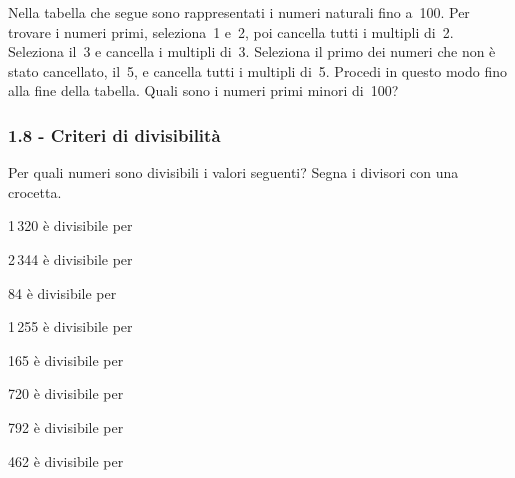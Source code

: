 \begin{esercizio}
\label{ese:1.16}
\begin{multicols}{2}
Nella tabella che segue sono rappresentati i numeri naturali fino a~100. Per trovare i
numeri primi, seleziona~1 e~2, poi cancella tutti i multipli di~2. Seleziona il~3 e cancella i multipli di~3. Seleziona il
primo dei numeri che non è stato cancellato, il~5, e cancella
tutti i multipli di~5. Procedi in questo modo fino alla fine
della tabella. Quali sono i numeri primi minori di~100?

\columnbreak\vfil

\end{multicols}
\end{esercizio}

\subsubsection*{1.8 - Criteri di divisibilità}
\begin{esercizio}
\label{ese:1.17}
 Per quali numeri sono divisibili i valori seguenti? Segna i divisori con una crocetta.
\TabPositions{3.5cm}
 \begin{enumeratea}
 \item 1\,320 è divisibile per \tab{}\:\:\:\:\:\:\:\:\:
 \item 2\,344 è divisibile per \tab{}\:\:\:\:\:\:\:\:\:
 \item 84 è divisibile per \tab{}\:\:\:\:\:\:\:\:\:
 \item 1\,255 è divisibile per \tab{}\:\:\:\:\:\:\:\:\:
 \item 165 è divisibile per \tab{}\:\:\:\:\:\:\:\:\:
 \item 720 è divisibile per \tab{}\:\:\:\:\:\:\:\:\:
 \item 792 è divisibile per \tab{}\:\:\:\:\:\:\:\:\:
 \item 462 è divisibile per \tab{}\:\:\:\:\:\:\:\:\:
 \end{enumeratea}
\end{esercizio}


